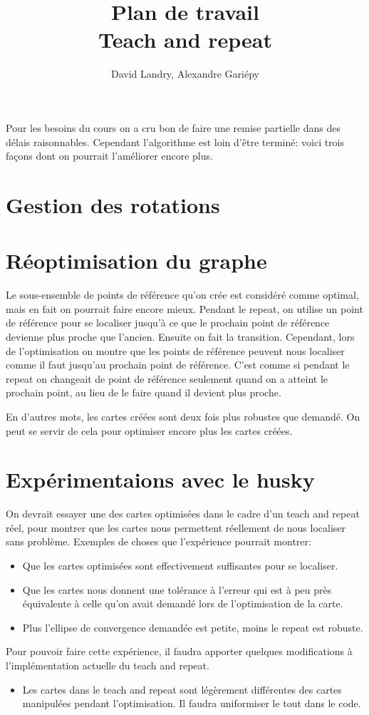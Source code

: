 \documentclass[letterpaper]{article}
\title{Plan de travail \\ Teach and repeat}
\author{David Landry, Alexandre Gariépy}
\begin{document}
\maketitle

Pour les besoins du cours on a cru bon de faire une remise partielle dans des délais
raisonnables. Cependant l'algorithme est loin d'être terminé: voici trois façons dont on pourrait
l'améliorer encore plus.

\section{Gestion des rotations}

\section{Réoptimisation du graphe}

Le sous-ensemble de points de référence qu'on crée est considéré comme optimal, mais en fait on
pourrait faire encore mieux. Pendant le repeat, on utilise un point de référence pour se localiser
jusqu'à ce que le prochain point de référence devienne plus proche que l'ancien. Ensuite on fait la
transition. Cependant, lors de l'optimisation on montre que les points de référence peuvent nous
localiser comme il faut jusqu'au prochain point de référence. C'est comme si pendant le repeat on
changeait de point de référence seulement quand on a atteint le prochain point, au lieu de le faire
quand il devient plus proche.

En d'autres mots, les cartes créées sont deux fois plus robustes que demandé. On peut se servir de
cela pour optimiser encore plus les cartes créées.

\section{Expérimentaions avec le husky}

On devrait essayer une des cartes optimisées dans le cadre d'un teach and repeat réel, pour montrer
que les cartes nous permettent réellement de nous localiser sans problème. Exemples de choses que
l'expérience pourrait montrer:

\begin{itemize}
\item Que les cartes optimisées sont effectivement suffisantes pour se localiser.
\item Que les cartes nous donnent une tolérance à l'erreur qui est à peu près équivalente à celle
  qu'on avait demandé lors de l'optimisation de la carte.
\item Plus l'ellipse de convergence demandée est petite, moins le repeat est robuste.
\end{itemize}

Pour pouvoir faire cette expérience, il faudra apporter quelques modifications à l'implémentation
actuelle du teach and repeat.

\begin{itemize}
\item Les cartes dans le teach and repeat sont légèrement différentes des cartes manipulées pendant
  l'optimisation. Il faudra uniformiser le tout dans le code.
\end{itemize}
\end{document}
